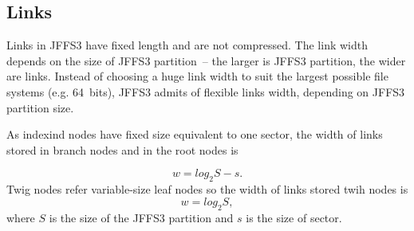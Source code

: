 %
%
\subsection{Links} \label{ref_SectionKeys}

Links in JFFS3 have fixed length and are not compressed. The link width depends
on the size of JFFS3 partition~-- the larger is JFFS3 partition, the wider are
links. Instead of choosing a huge link width to suit the largest possible file
systems (e.g. 64~bits), JFFS3 admits of flexible links width, depending on
JFFS3 partition size.

As indexind nodes have fixed size equivalent to one sector, the width of links
stored in branch nodes and in the root nodes is

$$
w = log_2{S} - s.
$$
Twig nodes refer variable-size leaf nodes so the width of links stored twih
nodes is
$$
w = log_2{S},
$$
where $S$ is the size of the JFFS3 partition and $s$ is the size of sector.

